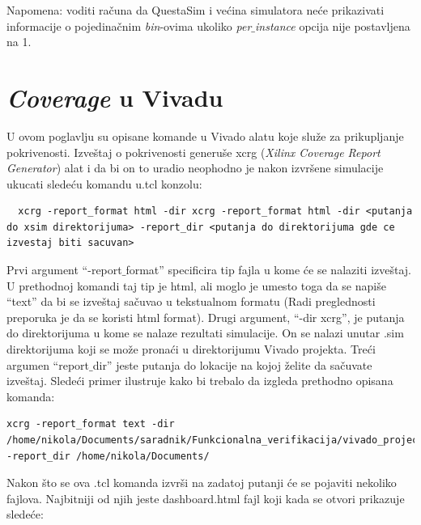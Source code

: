 Napomena: voditi računa da QuestaSim i većina simulatora neće prikazivati
informacije o pojedinačnim \emph{bin}-ovima ukoliko \emph{per\(\_\)instance}
opcija nije postavljena na 1.


\section{\emph{Coverage} u Vivadu}

U ovom poglavlju su opisane komande u Vivado alatu koje služe za prikupljanje pokrivenosti. Izveštaj
o pokrivenosti generuše xcrg (\emph{Xilinx Coverage Report Generator}) alat i da bi on to uradio
neophodno je nakon izvršene simulacije ukucati sledeću komandu u.tcl konzolu:
\begin{lstlisting}
  xcrg -report_format html -dir xcrg -report_format html -dir <putanja do xsim direktorijuma> -report_dir <putanja do direktorijuma gde ce izvestaj biti sacuvan>
\end{lstlisting}

Prvi argument ``-report\(\_\)format'' specificira tip fajla u kome će se nalaziti izveštaj. U prethodnoj komandi taj tip je html, ali moglo je umesto toga
da se napiše ``text'' da bi se izveštaj sačuvao u tekstualnom formatu (Radi preglednosti preporuka je da se koristi html format). Drugi argument,
``-dir xcrg'', je putanja do direktorijuma u kome se nalaze rezultati simulacije. On se nalazi unutar .sim direktorijuma koji se može pronaći
u direktorijumu Vivado projekta. Treći argumen ``report\(\_\)dir'' jeste putanja do lokacije na kojoj želite da sačuvate izveštaj. Sledeći primer ilustruje
kako bi trebalo da izgleda prethodno opisana komanda:

\begin{lstlisting}
xcrg -report_format text -dir /home/nikola/Documents/saradnik/Funkcionalna_verifikacija/vivado_projects/v11_vivado_priprema/v11_vivado_priprema.sim/sim_1/behav/xsim -report_dir /home/nikola/Documents/  
\end{lstlisting}

Nakon što se ova .tcl komanda izvrši na zadatoj putanji će se pojaviti nekoliko fajlova. Najbitniji od njih jeste
dashboard.html fajl koji kada se otvori prikazuje sledeće:

